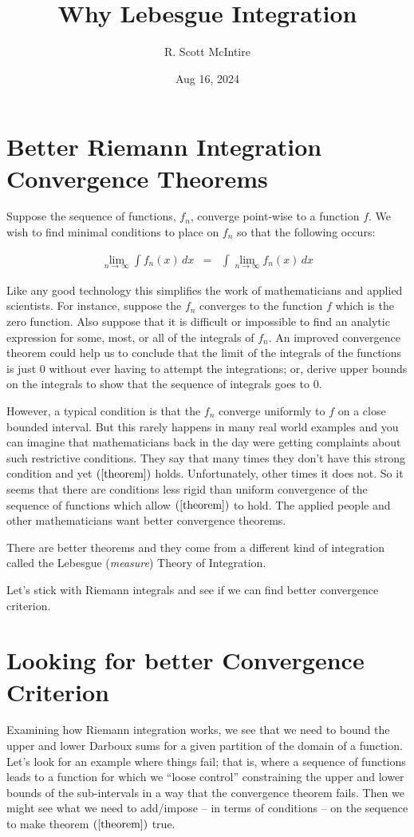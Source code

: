 \documentclass{article}
\title{Why Lebesgue Integration}
\author{R. Scott McIntire}
\date{Aug 16, 2024}
\begin{document}
\maketitle


\section{Better Riemann Integration Convergence Theorems}
Suppose the sequence of functions, $f_n$, converge point-wise to a function $f$.
We wish to find minimal conditions to place on $f_n$ so that the following occurs:

\begin{eqnarray}
	\lim_{n \rightarrow \infty}\limits \int f_n(x) \, dx & = & \int \lim_{n \rightarrow \infty}\limits f_n(x) \, dx \label{theorem}
\end{eqnarray}

Like any good technology this simplifies the work of mathematicians 
and applied scientists. For instance, suppose the $f_n$ converges to the function $f$ 
which is the zero function. Also suppose that it is difficult or impossible to 
find an analytic expression for some, most, or all of the integrals of $f_n$. 
An improved convergence theorem could help us to conclude that the limit of the integrals of 
the functions is just $0$ without ever having to attempt the integrations; or, 
derive upper bounds on the integrals to show that 
the sequence of integrals goes to $0$.

However, a typical condition is that the $f_n$ converge 
uniformly to $f$ on a close bounded interval. 
But this rarely happens in many real world examples and you can imagine that
mathematicians back in the day
were getting complaints about such restrictive 
conditions. They say that many times they don't have this strong condition and yet $(\ref{theorem})$
holds. Unfortunately, other times it does not. So it seems that there are 
conditions less rigid than uniform convergence of the sequence of 
functions which allow $(\ref{theorem})$ to hold.
The applied people and other mathematicians want better convergence theorems.

There are better theorems and they come from a different kind of integration called 
the Lebesgue ({\em measure}) Theory of Integration.

Let's stick with Riemann integrals and see if we can find better convergence 
criterion.

\section{Looking for better Convergence Criterion}
Examining how Riemann integration works, we see that we need to bound the upper 
and lower Darboux sums for a given partition of the domain of a function. 
Let's look for an example where things fail; that is, where 
a sequence of functions leads to a function for which we ``loose control'' 
constraining the upper and lower bounds of the sub-intervals in a way that the 
convergence theorem fails. Then we might see what we need to add/impose 
-- in terms of conditions -- on the sequence to make theorem 
$(\ref{theorem})$ true.
\end{document}
